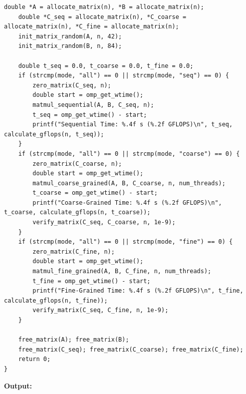 \documentclass[12pt]{article}
\begin{document}
\begin{lstlisting}[style=code]
    double *A = allocate_matrix(n), *B = allocate_matrix(n);
    double *C_seq = allocate_matrix(n), *C_coarse = allocate_matrix(n), *C_fine = allocate_matrix(n);
    init_matrix_random(A, n, 42);
    init_matrix_random(B, n, 84);

    double t_seq = 0.0, t_coarse = 0.0, t_fine = 0.0;
    if (strcmp(mode, "all") == 0 || strcmp(mode, "seq") == 0) {
        zero_matrix(C_seq, n);
        double start = omp_get_wtime();
        matmul_sequential(A, B, C_seq, n);
        t_seq = omp_get_wtime() - start;
        printf("Sequential Time: %.4f s (%.2f GFLOPS)\n", t_seq, calculate_gflops(n, t_seq));
    }
    if (strcmp(mode, "all") == 0 || strcmp(mode, "coarse") == 0) {
        zero_matrix(C_coarse, n);
        double start = omp_get_wtime();
        matmul_coarse_grained(A, B, C_coarse, n, num_threads);
        t_coarse = omp_get_wtime() - start;
        printf("Coarse-Grained Time: %.4f s (%.2f GFLOPS)\n", t_coarse, calculate_gflops(n, t_coarse));
        verify_matrix(C_seq, C_coarse, n, 1e-9);
    }
    if (strcmp(mode, "all") == 0 || strcmp(mode, "fine") == 0) {
        zero_matrix(C_fine, n);
        double start = omp_get_wtime();
        matmul_fine_grained(A, B, C_fine, n, num_threads);
        t_fine = omp_get_wtime() - start;
        printf("Fine-Grained Time: %.4f s (%.2f GFLOPS)\n", t_fine, calculate_gflops(n, t_fine));
        verify_matrix(C_seq, C_fine, n, 1e-9);
    }

    free_matrix(A); free_matrix(B);
    free_matrix(C_seq); free_matrix(C_coarse); free_matrix(C_fine);
    return 0;
}
\end{lstlisting}

\newpage

\textbf{Output:}
\end{document}
